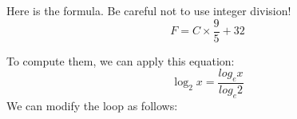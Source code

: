 Here is the formula.
Be careful not to use integer division!
%
\[ F = C \times \frac{9}{5} + 32 \]

To compute them, we can apply this equation:
%
\[ \log_2 x = \frac{log_e x}{log_e 2} \]
%
We can modify the loop as follows:
